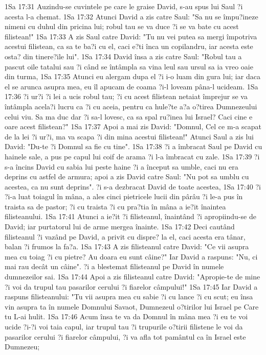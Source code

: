 1Sa 17:31  Auzindu-se cuvintele pe care le graise David, s-au spus lui Saul ?i acesta l-a chemat.
1Sa 17:32  Atunci David a zis catre Saul: "Sa nu se împu?ineze nimeni cu duhul din pricina lui; robul tau se va duce ?i se va bate cu acest filistean!"
1Sa 17:33  A zis Saul catre David: "Tu nu vei putea sa mergi împotriva acestui filistean, ca sa te ba?i cu el, caci e?ti înca un copilandru, iar acesta este osta? din tinere?ile lui".
1Sa 17:34  David însa a zis catre Saul: "Robul tau a pascut oile tatalui sau ?i când se întâmpla sa vina leul sau ursul sa ia vreo oaie din turma,
1Sa 17:35  Atunci eu alergam dupa el ?i i-o luam din gura lui; iar daca el se arunca asupra mea, eu îl apucam de coama ?i-l loveam pâna-l ucideam.
1Sa 17:36  ?i ur?i ?i lei a ucis robul tau; ?i cu acest filistean netaiat împrejur se va întâmpla acela?i lucru ca ?i cu aceia, pentru ca hule?te a?a o?tirea Dumnezeului celui viu. Sa ma duc dar ?i sa-l lovesc, ca sa spal ru?inea lui Israel? Caci cine e oare acest filistean?"
1Sa 17:37  Apoi a mai zis David: "Domnul, Cel ce m-a scapat de la lei ?i ur?i, ma va scapa ?i din mina acestui filistean!" Atunci Saul a zis lui David: "Du-te ?i Domnul sa fie cu tine".
1Sa 17:38  ?i a îmbracat Saul pe David cu hainele sale, a pus pe capul lui coif de arama ?i l-a îmbracat cu zale.
1Sa 17:39  ?i s-a încins David cu sabia lui peste haine ?i a început sa umble, caci nu era deprins cu astfel de armura; apoi a zis David catre Saul: "Nu pot sa umblu cu acestea, ca nu sunt deprins". ?i s-a dezbracat David de toate acestea,
1Sa 17:40  ?i ?i-a luat toiagul în mâna, a ales cinci pietricele lucii din pârâu ?i le-a pus în traista sa de pastor; ?i cu traista ?i cu pra?tia în mâna a ie?it înaintea filisteanului.
1Sa 17:41  Atunci a ie?it ?i filisteanul, înaintând ?i apropiindu-se de David; iar purtatorul lui de arme mergea înainte.
1Sa 17:42  Deci cautând filisteanul ?i vazând pe David, a privit cu dispre? la el, caci acesta era tânar, balan ?i frumos la fa?a.
1Sa 17:43  A zis filisteanul catre David: "Ce vii asupra mea cu toiag ?i cu pietre? Au doara eu sunt câine?" Iar David a raspuns: "Nu, ci mai rau decât un câine". ?i a blestemat filisteanul pe David în numele dumnezeilor sai.
1Sa 17:44  Apoi a zis filisteanul catre David: "Apropie-te de mine ?i voi da trupul tau pasarilor cerului ?i fiarelor câmpului!"
1Sa 17:45  Iar David a raspuns filisteanului: "Tu vii asupra mea cu sabie ?i cu lance ?i cu scut; eu însa vin asupra ta în numele Domnului Savaot, Dumnezeul o?tirilor lui Israel pe Care tu L-ai hulit.
1Sa 17:46  Acum însa te va da Domnul în mâna mea ?i eu te voi ucide ?i-?i voi taia capul, iar trupul tau ?i trupurile o?tirii filistene le voi da pasarilor cerului ?i fiarelor câmpului, ?i va afla tot pamântul ca în Israel este Dumnezeu;

